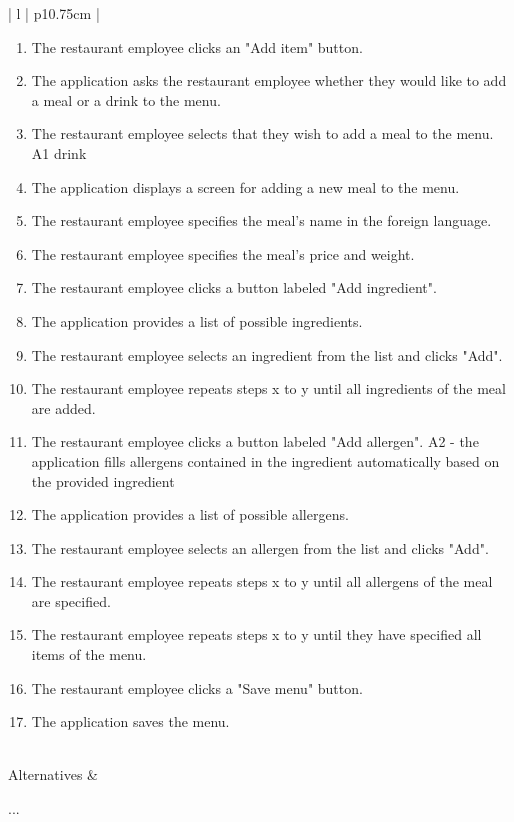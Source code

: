 \begin{center}
\begin{tabular}{| l | p{10.75cm} | }
\begin{minipage}[t]{\linewidth}
\begin{enumerate}[leftmargin=*,nosep,before=\vspace{-0.575\baselineskip},after=\strut]
        \item The restaurant employee clicks an "Add item" button.
        \item The application asks the restaurant employee whether they would like to add a meal or a drink to the menu.
        \item The restaurant employee selects that they wish to add a meal to the menu. A1 drink
        \item The application displays a screen for adding a new meal to the menu.
        \item The restaurant employee specifies the meal's name in the foreign language.
        \item The restaurant employee specifies the meal's price and weight.
        \item The restaurant employee clicks a button labeled "Add ingredient".
        \item The application provides a list of possible ingredients.
        \item The restaurant employee selects an ingredient from the list and clicks "Add".
        \item The restaurant employee repeats steps x to y until all ingredients of the meal are added.
        \item The restaurant employee clicks a button labeled "Add allergen". A2 - the application fills allergens contained in the ingredient automatically based on the provided ingredient
        \item The application provides a list of possible allergens.
        \item The restaurant employee selects an allergen from the list and clicks "Add".
        \item The restaurant employee repeats steps x to y until all allergens of the meal are specified.
        \item The restaurant employee repeats steps x to y until they have specified all items of the menu.

        \item The restaurant employee clicks a "Save menu" button.
        \item The application saves the menu.
      \end{enumerate}
    \end{minipage}
    \\
    \hline
    Alternatives &
    \begin{minipage}[t]{\linewidth}
      \begin{description}[nosep,after=\strut]
        \item [A1:] ...
      \end{description}
    \end{minipage}
    \\
    \hline
  \end{tabular}
  \newline
\end{center}


